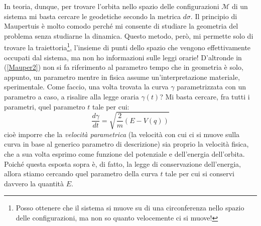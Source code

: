 \documentclass[a4paper,openany]{article}
\begin{document}
	In teoria, dunque, per trovare l'orbita nello spazio delle configurazioni $\mathcal{M}$ di un sistema mi basta cercare le geodetiche secondo la metrica $d\sigma$. Il principio di Maupertuis è molto comodo perché mi consente di studiare la geometria del problema senza studiarne la dinamica. Questo metodo, però, mi permette solo di trovare la traiettoria\footnote{Posso ottenere che il sistema si muove su di una circonferenza nello spazio delle configurazioni, ma non so quanto velocemente ci si muove!}, l'insieme di punti dello spazio che vengono effettivamente occupati dal sistema, ma non ho informazioni sulle leggi orarie! D'altronde in (\ref{Mauper2}) non si fa riferimento al parametro tempo che in geometria è solo, appunto, un parametro mentre in fisica assume un'interpretazione materiale, sperimentale. Come faccio, una volta trovata la curva $\gamma$ parametrizzata con un parametro a caso, a risalire alla legge oraria $\gamma(t)$? Mi basta cercare, fra tutti i parametri, quel parametro $t$ tale per cui:
	\begin{equation}\label{key}
		\dfrac{d\gamma}{dt} = \sqrt{\dfrac{2}{m}(E-V(q))}
	\end{equation}
cioè imporre che la \textit{velocità parametrica} (la velocità con cui ci si muove sulla curva in base al generico parametro di descrizione) sia proprio la velocità fisica, che a sua volta esprimo come funzione del potenziale e dell'energia dell'orbita. Poiché questa esposta sopra è, di fatto, la legge di conservazione dell'energia, allora stiamo cercando quel parametro della curva $t$ tale per cui si conservi davvero la quantità $E$.
\end{document}

